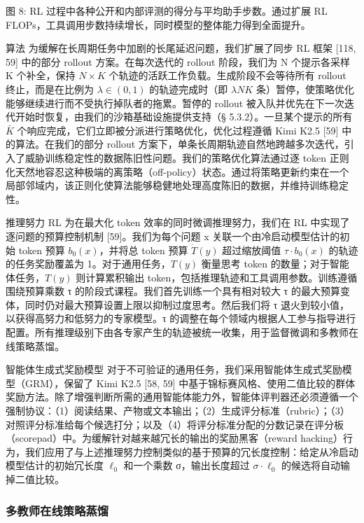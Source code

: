 图 8: RL 过程中各种公开和内部评测的得分与平均助手步数。通过扩展 RL FLOPs，工具调用步数持续增长，同时模型的整体能力得到全面提升。

算法 为缓解在长周期任务中加剧的长尾延迟问题，我们扩展了同步 RL 框架 {[}118, 59{]} 中的部分 rollout 方案。在每次迭代的 rollout 阶段，我们为 N 个提示各采样 K 个补全，保持 \(N \times K\) 个轨迹的活跃工作负载。生成阶段不会等待所有 rollout 终止，而是在比例为 \(\lambda \in ( 0 , 1 )\) 的轨迹完成时（即 \(\lambda N K\) 条）暂停，使策略优化能够继续进行而不受执行掉队者的拖累。暂停的 rollout 被入队并优先在下一次迭代开始时恢复，由我们的沙箱基础设施提供支持（§ 5.3.2）。一旦某个提示的所有 \(\bar { K }\) 个响应完成，它们立即被分派进行策略优化，优化过程遵循 Kimi K2.5 {[}59{]} 中的算法。在我们的部分 rollout 方案下，单条长周期轨迹自然地跨越多次迭代，引入了威胁训练稳定性的数据陈旧性问题。我们的策略优化算法通过逐 token 正则化天然地容忍这种极端的离策略（off-policy）状态。通过将策略更新约束在一个局部邻域内，该正则化使算法能够稳健地处理高度陈旧的数据，并维持训练稳定性。

推理努力 RL 为在最大化 token 效率的同时微调推理努力，我们在 RL 中实现了逐问题的预算控制机制 {[}59{]}。我们为每个问题 x 关联一个由冷启动模型估计的初始 token 预算 \(b _ { 0 } ( x )\)，并将总 token 预算 \(\dot { T } ( y )\) 超过缩放阈值 \(\tau \cdot b _ { 0 } ( x )\) 的轨迹的任务奖励覆盖为 1。对于通用任务，\(T ( y )\) 衡量思考 token 的数量；对于智能体任务，\(T ( y )\) 则计算累积输出 token，包括推理轨迹和工具调用参数。训练遵循围绕预算乘数 τ 的阶段式课程。我们首先训练一个具有相对较大 τ 的最大预算变体，同时仍对最大预算设置上限以抑制过度思考。然后我们将 τ 退火到较小值，以获得高努力和低努力的专家模型。τ 的调整在每个领域内根据人工参与指导进行配置。所有推理级别下由各专家产生的轨迹被统一收集，用于监督微调和多教师在线策略蒸馏。

智能体生成式奖励模型 对于不可验证的通用任务，我们采用智能体生成式奖励模型（GRM），保留了 Kimi K2.5 {[}58, 59{]} 中基于锦标赛风格、使用二值比较的群体奖励方法。除了增强判断所需的通用智能体能力外，智能体评判器还必须遵循一个强制协议：（1）阅读结果、产物或文本输出；（2）生成评分标准（rubric）；（3）对照评分标准给每个候选打分；以及（4）将评分标准分配的分数记录在评分板（scorepad）中。为缓解针对越来越冗长的输出的奖励黑客（reward hacking）行为，我们应用了与上述推理努力控制类似的基于预算的冗长度控制：给定从冷启动模型估计的初始冗长度 \(\ell _ { 0 }\) 和一个乘数 σ，输出长度超过 \(\sigma \cdot \ell _ { 0 }\) 的候选将自动输掉二值比较。

\subsubsection{多教师在线策略蒸馏}\label{multi-teacher-on-policy-distillation}


